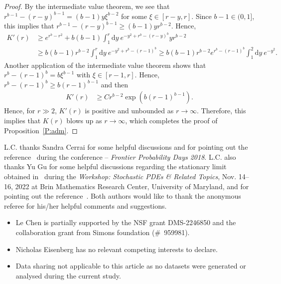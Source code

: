 \documentclass[sn-mathphys]{sn-jnl}%
\newcommand{\ud}{\ensuremath{\mathrm{d}}}
\numberwithin{equation}{section}
\theoremstyle{thmstyleone}%
\theoremstyle{thmstyletwo}%
\theoremstyle{thmstylethree}%
\begin{document}
\begin{proof}
  By the intermediate value theorem, we see that $r^{b-1} - (r-y)^{b-1} = (b-1) y \xi^{b-2}$ for
  some $\xi\in [r-y,r]$. Since $b-1\in(0,1]$, this implies that $r^{b-1} - (r-y)^{b-1} \ge (b-1) y
  r^{b-2}$. Hence,
	\begin{align*}
    K'(r) & \ge  e^{r^b-r^2} + b(b-1) \int_1^r \ud y\: e^{ - y^2 + r^b - (r-y)^b } y r^{b-2} \\
          & \ge  b(b-1)r^{b-2} \int_1^r \ud y\: e^{ - y^2 + r^b - (r-1)^b }
            \ge  b(b-1)r^{b-2} e^{r^b-(r-1)^b}\int_1^2 \ud y\: e^{ - y^2 }.
	\end{align*}
  Another application of the intermediate value theorem shows that $r^b-(r-1)^b = b \xi^{b-1}$ with
  $\xi\in [r-1,r]$. Hence, $r^b-(r-1)^b \ge b (r-1)^{b-1}$ and then
	\begin{align*}
	K'(r) & \ge C r^{b-2} \exp\left(b (r-1)^{b-1}\right).
	\end{align*}
  Hence, for $r \gg 2$, $K'(r)$ is positive and unbounded as $r\to\infty$. Therefore, this implies
  that $K(r)$ blows up as $r\to\infty$, which completes the proof of Proposition~\ref{P:adm}.
\end{proof}

\backmatter


L.C. thanks Sandra Cerrai for some helpful discussions and for pointing out the
reference~\cite{misiats.stanzhytskyi.ea:16:existence} during the conference -- \textit{Frontier
Probability Days 2018}. L.C. also thanks Yu Gu for some helpful discussions regarding the stationary
limit obtained in~\cite{gu.li:20:fluctuations} during the \textit{Workshop: Stochastic PDEs \&
Related Topics}, Nov. 14--16, 2022 at Brin Mathematics Research Center, University of Maryland, and
for pointing out the reference~\cite{dunlap.gu.ea:21:random}. Both authors would like to thank the
anonymous referee for his/her helpful comments and suggestions.

\begin{itemize}
  \item Le Chen is partially supported by the NSF grant DMS-2246850 and the collaboration grant from
    Simons foundation (\#~959981).
	\item Nicholas Eisenberg has no relevant competing interests to declare.
  \item  Data sharing not applicable to this article as no datasets were generated or analysed
    during the current study.
\end{itemize}
\end{document}
